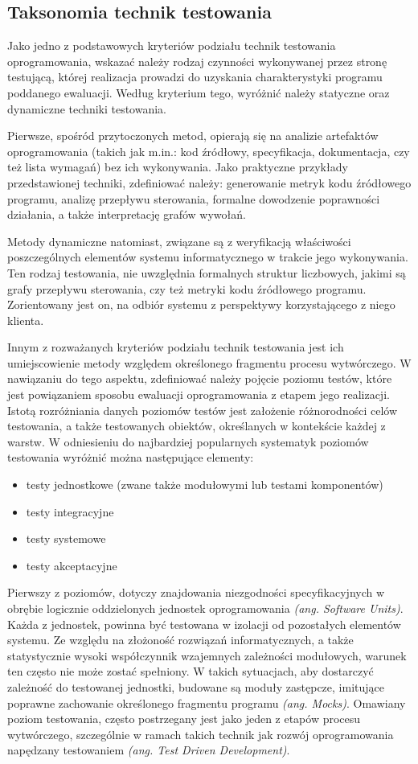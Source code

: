 \subsection*{Taksonomia technik testowania}
Jako jedno z podstawowych kryteriów podziału technik testowania oprogramowania, wskazać należy rodzaj czynności wykonywanej przez stronę testującą, której realizacja prowadzi do uzyskania charakterystyki programu poddanego ewaluacji. Według kryterium tego, wyróżnić należy statyczne oraz dynamiczne techniki testowania.

Pierwsze, spośród przytoczonych metod, opierają się na analizie artefaktów oprogramowania (takich jak m.in.: kod źródłowy, specyfikacja, dokumentacja, czy też lista wymagań) bez ich wykonywania. Jako praktyczne przykłady przedstawionej techniki, zdefiniować należy: generowanie metryk kodu źródłowego programu, analizę przepływu sterowania, formalne dowodzenie poprawności działania, a także interpretację grafów wywołań.

Metody dynamiczne natomiast, związane są z weryfikacją właściwości poszczególnych elementów systemu informatycznego w trakcie jego wykonywania. Ten rodzaj testowania, nie uwzględnia formalnych struktur liczbowych, jakimi są grafy przepływu sterowania, czy też metryki kodu źródłowego programu. Zorientowany jest on, na odbiór systemu z perspektywy korzystającego z niego klienta.

Innym z rozważanych kryteriów podziału technik testowania jest ich umiejscowienie metody względem określonego fragmentu procesu wytwórczego. W nawiązaniu do tego aspektu, zdefiniować należy pojęcie poziomu testów, które jest powiązaniem sposobu ewaluacji oprogramowania z etapem jego realizacji. Istotą rozróżniania danych poziomów testów jest założenie różnorodności celów testowania, a także testowanych obiektów, określanych w kontekście każdej z warstw. W odniesieniu do najbardziej popularnych systematyk poziomów testowania wyróżnić można następujące elementy:
\begin{itemize}
    \item testy jednostkowe (zwane także modułowymi lub testami komponentów)
    \item testy integracyjne
    \item testy systemowe
    \item testy akceptacyjne
\end{itemize}

Pierwszy z poziomów, dotyczy znajdowania niezgodności specyfikacyjnych w obrębie logicznie oddzielonych jednostek oprogramowania \textit{(ang. Software Units)}. Każda z jednostek, powinna być testowana w izolacji od pozostałych elementów systemu. Ze względu na złożoność rozwiązań informatycznych, a także statystycznie wysoki współczynnik wzajemnych zależności modułowych, warunek ten często nie może zostać spełniony. W takich sytuacjach, aby dostarczyć zależność do testowanej jednostki, budowane są moduły zastępcze, imitujące poprawne zachowanie określonego fragmentu programu \textit{(ang. Mocks)}. Omawiany poziom testowania, często postrzegany jest jako jeden z etapów procesu wytwórczego, szczególnie w ramach takich technik jak rozwój oprogramowania napędzany testowaniem \textit{(ang. Test Driven Development)}.

